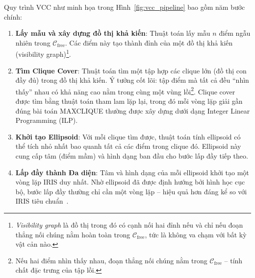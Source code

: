 Quy trình VCC như minh họa trong Hình~\ref{fig:vcc_pipeline} bao gồm năm bước chính:
\begin{enumerate}
\item \textbf{Lấy mẫu và xây dựng đồ thị khả kiến}: Thuật toán lấy mẫu $n$ điểm ngẫu nhiên trong $\mathcal{C}_{\mathrm{free}}$. Các điểm này tạo thành đỉnh của một đồ thị khả kiến (visibility graph)\footnote{\textit{Visibility graph} là đồ thị trong đó có cạnh nối hai đỉnh nếu và chỉ nếu đoạn thẳng nối chúng nằm hoàn toàn trong $\mathcal{C}_{\mathrm{free}}$, tức là không va chạm với bất kỳ vật cản nào.}.


\item \textbf{Tìm Clique Cover}: Thuật toán tìm một tập hợp các clique lớn (đồ thị con đầy đủ) trong đồ thị khả kiến. Ý tưởng cốt lõi: tập điểm mà tất cả đều ``nhìn thấy'' nhau có khả năng cao nằm trong cùng một vùng lồi\footnote{Nếu hai điểm nhìn thấy nhau, đoạn thẳng nối chúng nằm trong $\mathcal{C}_{\mathrm{free}}$ -- tính chất đặc trưng của tập lồi.}. Clique cover được tìm bằng thuật toán tham lam lặp lại, trong đó mỗi vòng lặp giải gần đúng bài toán MAXCLIQUE thường được xây dựng dưới dạng Integer Linear Programming (ILP).


\item \textbf{Khởi tạo Ellipsoid}: Với mỗi clique tìm được, thuật toán tính ellipsoid có thể tích nhỏ nhất bao quanh tất cả các điểm trong clique đó. Ellipsoid này cung cấp tâm (điểm mầm) và hình dạng ban đầu cho bước lấp đầy tiếp theo.


\item \textbf{Lấp đầy thành Đa diện}: Tâm và hình dạng của mỗi ellipsoid khởi tạo một vòng lặp IRIS duy nhất. Nhờ ellipsoid đã được định hướng bởi hình học cục bộ, bước lấp đầy thường chỉ cần một vòng lặp -- hiệu quả hơn đáng kể so với IRIS tiêu chuẩn~\cite{DeitsTedrake2023VCC}.


\end{enumerate}
